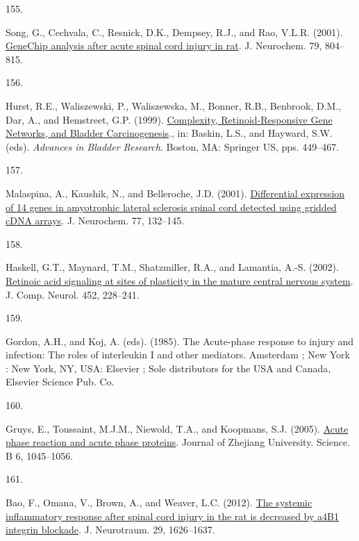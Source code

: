 \documentclass[
]{article}
\newlength{\cslhangindent}
\newlength{\csllabelwidth}
\newlength{\cslentryspacingunit} %
\newenvironment{CSLReferences}[2] %
 {%
  \setlength{\parindent}{0pt}
  \ifodd #1
  \let\oldpar\par
  \def\par{\hangindent=\cslhangindent\oldpar}
  \fi
  \setlength{\parskip}{#2\cslentryspacingunit}
 }%
 {}
\newcommand{\CSLLeftMargin}[1]{\parbox[t]{\csllabelwidth}{#1}}
\newcommand{\CSLRightInline}[1]{\parbox[t]{\linewidth - \csllabelwidth}{#1}\break}
\begin{document}
\begin{CSLReferences}{0}{0}
\leavevmode{}%
\CSLLeftMargin{155. }
\CSLRightInline{Song, G., Cechvala, C., Resnick, D.K., Dempsey, R.J., and Rao, V.L.R. (2001). \href{https://doi.org/10.1046/j.1471-4159.2001.00626.x}{{GeneChip} analysis after acute spinal cord injury in rat}. J. Neurochem. 79, 804--815.}

\leavevmode{}%
\CSLLeftMargin{156. }
\CSLRightInline{Hurst, R.E., Waliszewski, P., Waliszewska, M., Bonner, R.B., Benbrook, D.M., Dar, A., and Hemstreet, G.P. (1999). \href{https://doi.org/10.1007/978-1-4615-4737-2_35}{Complexity, {Retinoid-Responsive Gene Networks}, and {Bladder Carcinogenesis}}., in: Baskin, L.S., and Hayward, S.W. (eds). \emph{Advances in {Bladder Research}}. {Boston, MA}: {Springer US}, pps. 449--467.}

\leavevmode{}%
\CSLLeftMargin{157. }
\CSLRightInline{Malaspina, A., Kaushik, N., and Belleroche, J.D. (2001). \href{https://doi.org/10.1046/j.1471-4159.2001.00231.x}{Differential expression of 14 genes in amyotrophic lateral sclerosis spinal cord detected using gridded {cDNA} arrays}. J. Neurochem. 77, 132--145.}

\leavevmode{}%
\CSLLeftMargin{158. }
\CSLRightInline{Haskell, G.T., Maynard, T.M., Shatzmiller, R.A., and Lamantia, A.-S. (2002). \href{https://doi.org/10.1002/cne.10369}{Retinoic acid signaling at sites of plasticity in the mature central nervous system}. J. Comp. Neurol. 452, 228--241.}

\leavevmode{}%
\CSLLeftMargin{159. }
\CSLRightInline{Gordon, A.H., and Koj, A. (eds). (1985). The {Acute-phase} response to injury and infection: The roles of interleukin {I} and other mediators. {Amsterdam ; New York : New York, NY, USA}: {Elsevier ; Sole distributors for the USA and Canada, Elsevier Science Pub. Co}.}

\leavevmode{}%
\CSLLeftMargin{160. }
\CSLRightInline{Gruys, E., Toussaint, M.J.M., Niewold, T.A., and Koopmans, S.J. (2005). \href{https://doi.org/10.1631/jzus.2005.B1045}{Acute phase reaction and acute phase proteins}. Journal of Zhejiang University. Science. B 6, 1045--1056.}

\leavevmode{}%
\CSLLeftMargin{161. }
\CSLRightInline{Bao, F., Omana, V., Brown, A., and Weaver, L.C. (2012). \href{https://doi.org/10.1089/neu.2011.2190}{The systemic inflammatory response after spinal cord injury in the rat is decreased by {a4B1} integrin blockade}. J. Neurotraum. 29, 1626--1637.}


\end{CSLReferences}
\end{document}
